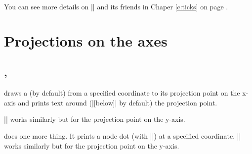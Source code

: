\begin{tzcode}{.3}
\end{tzcode}

You can see more details on |\tzticks| and its friends in Chaper \ref{c:ticks} on page \pageref{c:ticks}.


\section{Projections on the axes}
\label{si:projections}


\subsection{\protect\cmd{\tzprojx(*)}, \protect\cmd{\tzprojy(*)}}
\label{ssi:tzprojx}

\icmd{\tzprojx} draws a  (by default) from a specified coordinate to its projection point on the x-axis and prints text around (|[below]| by default) the projection point.

|\tzprojy| works similarly but for the projection point on the y-axis.

\begin{tzcode}{.3}
\end{tzcode}

\icmd{\tzprojx*} does one more thing. It prints a node dot (with |\tzdot*|) at a specified coordinate. |\tzprojy*| works similarly but for the projection point on the y-axis.


\begin{tzcode}{.3}
\end{tzcode}


\subsection{\protect\cmd{\tzproj(*)}}
\label{ssi:tzproj}

